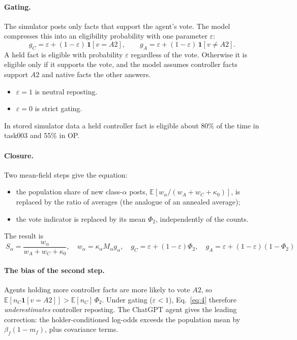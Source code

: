 \documentclass[10pt,a4paper]{article}
\theoremstyle{definition}
\newcommand{\E}{\mathbb E}
\begin{document}
\paragraph{Gating.} The simulator posts only facts that support the agent's vote. The model compresses this into an
eligibility probability with one parameter $\varepsilon$:
\begin{equation}
g_C=\varepsilon+(1-\varepsilon)\,\mathbf 1[v=A2],\qquad g_A=\varepsilon+(1-\varepsilon)\,\mathbf 1[v\neq A2].\label{eq:gate}
\end{equation}
A held fact is eligible with probability $\varepsilon$ regardless of the vote. Otherwise it is eligible only if it
supports the vote, and the model assumes controller facts support $A2$ and native facts the other answers.
\begin{itemize}
\item $\varepsilon=1$ is neutral reposting.
\item $\varepsilon=0$ is strict gating.
\end{itemize}
In stored simulator data a held controller fact is eligible about 80\% of the time in task003 and 55\% in OP.

\paragraph{Closure.} Two mean-field steps give the equation:
\begin{itemize}
\item the population share of new class-$\alpha$ posts, $\E[w_\alpha/(w_A+w_C+\kappa_0)]$, is replaced by the ratio of
  averages (the analogue of an annealed average);
\item the vote indicator is replaced by its mean $\Phi_2$, independently of the counts.
\end{itemize}
The result is
\begin{equation}
\boxed{\ S_\alpha=\frac{w_\alpha}{w_A+w_C+\kappa_0},\quad w_\alpha=\kappa_\alpha M_\alpha g_\alpha,\quad
g_C=\varepsilon+(1-\varepsilon)\Phi_2,\quad g_A=\varepsilon+(1-\varepsilon)(1-\Phi_2)\ }\label{eq:4}
\end{equation}

\paragraph{The bias of the second step.} Agents holding more controller facts are more likely to vote $A2$, so
$\E[n_C\mathbf 1[v=A2]]>\E[n_C]\,\Phi_2$. Under gating ($\varepsilon<1$), Eq.~\eqref{eq:4} therefore
\emph{underestimates} controller reposting. The ChatGPT agent gives the leading correction: the holder-conditioned
log-odds exceeds the population mean by $\beta_f(1-m_f)$, plus covariance terms.
\end{document}
